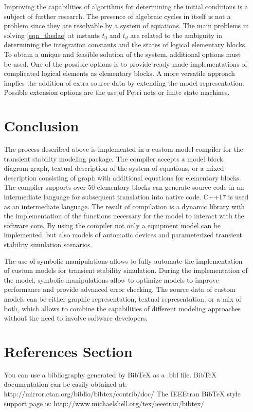 \documentclass[lettersize,journal]{IEEEtran}
\begin{document}
Improving the capabilities of algorithms for determining the initial conditions is a subject of further research. 
The presence of algebraic cycles in itself is not a problem since they are resolvable by a system of equations. The main 
problems in solving \eqref{eqn_thedae} at instants \(t_0\) and \(t_d\) are related to the ambiguity in determining the 
integration constants and the states of logical elementary blocks. To obtain a unique and feasible solution of the system, 
additional options must be used. One of the possible options is to provide ready-made implementations 
of complicated logical elements as elementary blocks. A more versatile approach implies the addition of extra source data by 
extending the model representation. Possible extension options are the use of Petri nets or finite state machines.

\section{Conclusion}

The process described above is implemented in a custom model compiler for the transient stability modeling package. 
The compiler accepts a model block diagram graph, textual description of the system of equations, or a mixed description consisting of
graph with additional equations for elementary blocks. The compiler supports over 50 elementary blocks can generate source code in an intermediate 
language for subsequent translation into native code. C++17 is used as an intermediate language. 
The result of compilation is a dynamic library with the implementation of the functions necessary for the model to interact with the software core. 
By using the compiler not only a equipment model can be implemented, but also models of automatic devices and parameterized transient stability simulation scenarios.

The use of symbolic manipulations allows to fully automate the implementation of custom models for transient stability simulation. 
During the implementation of the model, symbolic manipulations allow to optimize models to improve performance and provide advanced error checking. 
The source data of custom models can be either graphic representation, textual representation, or a mix of both, which allows to combine the capabilities of different modeling
approaches without the need to involve software developers.

\section{References Section}
You can use a bibliography generated by BibTeX as a .bbl file. \cite{texbook}
BibTeX documentation can be easily obtained at:
http://mirror.ctan.org/biblio/bibtex/contrib/doc/
The IEEEtran BibTeX style support page is:
http://www.michaelshell.org/tex/ieeetran/bibtex/
\end{document}
